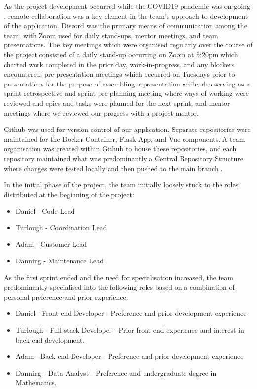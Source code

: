 \documentclass[]{UCD_CS_47360_Report}
\begin{document}
As the project development occurred while the COVID19 pandemic was on-going \cite{COVID19}, remote collaboration was a key element in the team's approach to development of the application. Discord was the primary means of communication among the team, with Zoom used for daily stand-ups, mentor meetings, and team presentations. The key meetings which were organised regularly over the course of the project consisted of a daily stand-up occurring on Zoom at $5$:$20$pm which charted work completed in the prior day, work-in-progress, and any blockers encountered; pre-presentation meetings which occurred on Tuesdays prior to presentations for the purpose of assembling a presentation while also serving as a sprint retrospective and sprint pre-planning meeting where ways of working were reviewed and epics and tasks were planned for the next sprint; and mentor meetings where we reviewed our progress with a project mentor.

Github was used for version control of our application. Separate repositories were maintained for the Docker Container, Flask App, and Vue components. A team organisation was created within Github to house these repositories, and each repository maintained what was predominantly a Central Repository Structure where changes were tested locally and then pushed to the main branch \cite{CentralRepository}.

In the initial phase of the project, the team initially loosely stuck to the roles distributed at the beginning of the project:
\begin{itemize}
    \item Daniel - Code Lead
    \item Turlough - Coordination Lead
    \item Adam - Customer Lead
    \item Danning - Maintenance Lead
\end{itemize}
As the first sprint ended and the need for specialisation increased, the team predominantly specialised into the following roles based on a combination of personal preference and prior experience:
\begin{itemize}
    \item Daniel - Front-end Developer - Preference and prior development experience
    \item Turlough - Full-stack Developer - Prior front-end experience and interest in back-end development.
    \item Adam - Back-end Developer - Preference and prior development experience
    \item Danning - Data Analyst - Preference and undergraduate degree in Mathematics.
\end{itemize}
\end{document}
